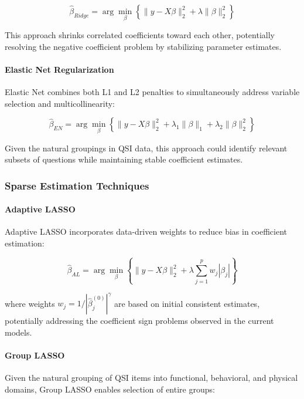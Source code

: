 \begin{equation}
\hat{\beta}_{Ridge} = \arg\min_{\beta} \left\{ \|y - X\beta\|_2^2 + \lambda\|\beta\|_2^2 \right\}
\end{equation}

This approach shrinks correlated coefficients toward each other, potentially resolving the negative coefficient problem by stabilizing parameter estimates.

\paragraph{Elastic Net Regularization}
Elastic Net combines both L1 and L2 penalties to simultaneously address variable selection and multicollinearity:

\begin{equation}
\hat{\beta}_{EN} = \arg\min_{\beta} \left\{ \|y - X\beta\|_2^2 + \lambda_1\|\beta\|_1 + \lambda_2\|\beta\|_2^2 \right\}
\end{equation}

Given the natural groupings in QSI data, this approach could identify relevant subsets of questions while maintaining stable coefficient estimates.

\subsubsection{Sparse Estimation Techniques}

\paragraph{Adaptive LASSO}
Adaptive LASSO incorporates data-driven weights to reduce bias in coefficient estimation:

\begin{equation}
\hat{\beta}_{AL} = \arg\min_{\beta} \left\{ \|y - X\beta\|_2^2 + \lambda\sum_{j=1}^p w_j|\beta_j| \right\}
\end{equation}

where weights $w_j = 1/|\hat{\beta}_j^{(0)}|^\gamma$ are based on initial consistent estimates, potentially addressing the coefficient sign problems observed in the current models.

\paragraph{Group LASSO}
Given the natural grouping of QSI items into functional, behavioral, and physical domains, Group LASSO enables selection of entire groups:


